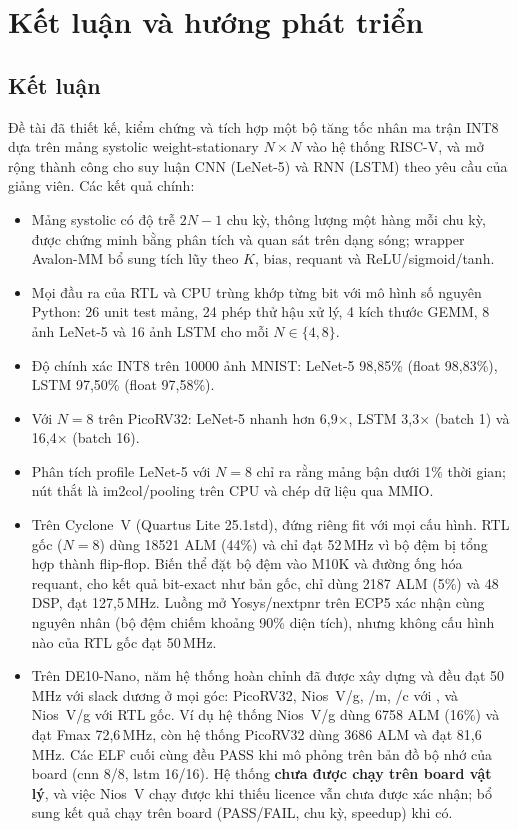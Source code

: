 \chapter{Kết luận và hướng phát triển}
\label{ch:concl}

\section{Kết luận}
Đề tài đã thiết kế, kiểm chứng và tích hợp một bộ tăng tốc nhân ma trận INT8 dựa trên mảng systolic weight-stationary $N\times N$ vào hệ thống RISC-V, và mở rộng thành công cho suy luận CNN (LeNet-5) và RNN (LSTM) theo yêu cầu của giảng viên. Các kết quả chính:
\begin{itemize}
  \item Mảng systolic có độ trễ $2N-1$ chu kỳ, thông lượng một hàng mỗi chu kỳ, được chứng minh bằng phân tích và quan sát trên dạng sóng; wrapper Avalon-MM bổ sung tích lũy theo $K$, bias, requant và ReLU/sigmoid/tanh.
  \item Mọi đầu ra của RTL và CPU trùng khớp từng bit với mô hình số nguyên Python: 26 unit test mảng, 24 phép thử hậu xử lý, 4 kích thước GEMM, 8 ảnh LeNet-5 và 16 ảnh LSTM cho mỗi $N\in\{4,8\}$.
  \item Độ chính xác INT8 trên \num{10000} ảnh MNIST: LeNet-5 98,85\% (float 98,83\%), LSTM 97,50\% (float 97,58\%).
  \item Với $N=8$ trên PicoRV32: LeNet-5 nhanh hơn 6,9$\times$, LSTM 3,3$\times$ (batch 1) và 16,4$\times$ (batch 16).
  \item Phân tích profile LeNet-5 với $N=8$ chỉ ra rằng mảng bận dưới 1\% thời gian; nút thắt là im2col/pooling trên CPU và chép dữ liệu qua MMIO.
  \item Trên Cyclone~V (Quartus Lite 25.1std),  đứng riêng fit với mọi cấu hình. RTL gốc ($N=8$) dùng \num{18521} ALM (44\%) và chỉ đạt 52\,MHz vì bộ đệm bị tổng hợp thành flip-flop. Biến thể  đặt bộ đệm vào M10K và đường ống hóa requant, cho kết quả bit-exact như bản gốc, chỉ dùng \num{2187} ALM (5\%) và 48 DSP, đạt 127,5\,MHz. Luồng mở Yosys/nextpnr trên ECP5 xác nhận cùng nguyên nhân (bộ đệm chiếm khoảng 90\% diện tích), nhưng không cấu hình nào của RTL gốc đạt 50\,MHz.
  \item Trên DE10-Nano, năm hệ thống hoàn chỉnh đã được xây dựng và đều đạt 50\,MHz với slack dương ở mọi góc: PicoRV32, Nios~V/g, /m, /c với \NPU{} , và Nios~V/g với RTL gốc. Ví dụ hệ thống Nios~V/g dùng \num{6758} ALM (16\%) và đạt Fmax 72,6\,MHz, còn hệ thống PicoRV32 dùng \num{3686} ALM và đạt 81,6\,MHz. Các ELF cuối cùng đều PASS khi mô phỏng trên bản đồ bộ nhớ của board (cnn 8/8, lstm 16/16). Hệ thống \textbf{chưa được chạy trên board vật lý}, và việc Nios~V chạy được khi thiếu licence vẫn chưa được xác nhận; bổ sung kết quả chạy trên board (PASS/FAIL, chu kỳ, speedup) khi có.
\end{itemize}

